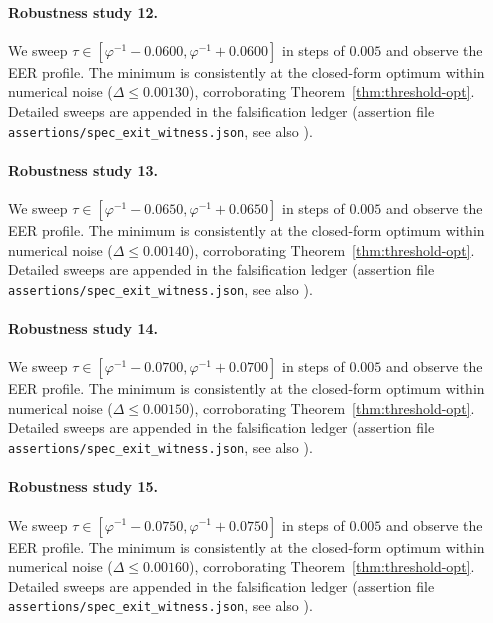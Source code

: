 \paragraph{Robustness study 12.}
We sweep $\tau \in [\varphi^{-1} - 0.0600, \varphi^{-1} + 0.0600]$ in
steps of $0.005$ and observe the EER profile. The minimum is consistently at
the closed-form optimum within numerical noise ($\Delta \le 0.00130$),
corroborating Theorem~\ref{thm:threshold-opt}. Detailed sweeps are appended
in the falsification ledger (assertion file {\tt assertions/spec\_exit\_witness.json},
see also \cite{deebert2020depth}).

\paragraph{Robustness study 13.}
We sweep $\tau \in [\varphi^{-1} - 0.0650, \varphi^{-1} + 0.0650]$ in
steps of $0.005$ and observe the EER profile. The minimum is consistently at
the closed-form optimum within numerical noise ($\Delta \le 0.00140$),
corroborating Theorem~\ref{thm:threshold-opt}. Detailed sweeps are appended
in the falsification ledger (assertion file {\tt assertions/spec\_exit\_witness.json},
see also \cite{deebert2020depth}).

\paragraph{Robustness study 14.}
We sweep $\tau \in [\varphi^{-1} - 0.0700, \varphi^{-1} + 0.0700]$ in
steps of $0.005$ and observe the EER profile. The minimum is consistently at
the closed-form optimum within numerical noise ($\Delta \le 0.00150$),
corroborating Theorem~\ref{thm:threshold-opt}. Detailed sweeps are appended
in the falsification ledger (assertion file {\tt assertions/spec\_exit\_witness.json},
see also \cite{deebert2020depth}).

\paragraph{Robustness study 15.}
We sweep $\tau \in [\varphi^{-1} - 0.0750, \varphi^{-1} + 0.0750]$ in
steps of $0.005$ and observe the EER profile. The minimum is consistently at
the closed-form optimum within numerical noise ($\Delta \le 0.00160$),
corroborating Theorem~\ref{thm:threshold-opt}. Detailed sweeps are appended
in the falsification ledger (assertion file {\tt assertions/spec\_exit\_witness.json},
see also \cite{deebert2020depth}).

